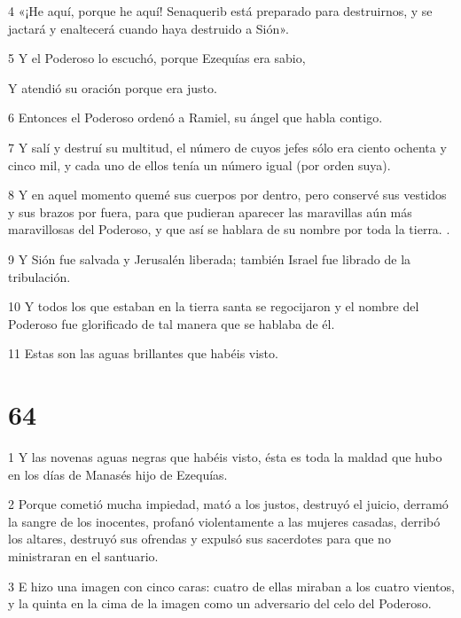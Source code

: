 \par 4 «¡He aquí, porque he aquí! Senaquerib está preparado para destruirnos, y se jactará y enaltecerá cuando haya destruido a Sión».

\par 5 Y el Poderoso lo escuchó, porque Ezequías era sabio,

\par Y atendió su oración porque era justo.

\par 6 Entonces el Poderoso ordenó a Ramiel, su ángel que habla contigo.

\par 7 Y salí y destruí su multitud, el número de cuyos jefes sólo era ciento ochenta y cinco mil, y cada uno de ellos tenía un número igual (por orden suya).

\par 8 Y en aquel momento quemé sus cuerpos por dentro, pero conservé sus vestidos y sus brazos por fuera, para que pudieran aparecer las maravillas aún más maravillosas del Poderoso, y que así se hablara de su nombre por toda la tierra. .

\par 9 Y Sión fue salvada y Jerusalén liberada; también Israel fue librado de la tribulación.

\par 10 Y todos los que estaban en la tierra santa se regocijaron y el nombre del Poderoso fue glorificado de tal manera que se hablaba de él.

\par 11 Estas son las aguas brillantes que habéis visto.

\chapter{64}

\par 1 Y las novenas aguas negras que habéis visto, ésta es toda la maldad que hubo en los días de Manasés hijo de Ezequías.

\par 2 Porque cometió mucha impiedad, mató a los justos, destruyó el juicio, derramó la sangre de los inocentes, profanó violentamente a las mujeres casadas, derribó los altares, destruyó sus ofrendas y expulsó sus sacerdotes para que no ministraran en el santuario.

\par 3 E hizo una imagen con cinco caras: cuatro de ellas miraban a los cuatro vientos, y la quinta en la cima de la imagen como un adversario del celo del Poderoso.

